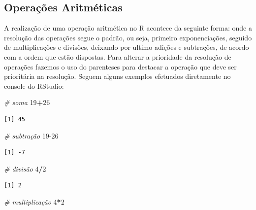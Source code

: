 \documentclass[12pt,brazil,oneside]{book}
\newenvironment{Shaded}{\begin{snugshade}}{\end{snugshade}}
\newcommand{\CommentTok}[1]{\textcolor[rgb]{0.56,0.35,0.01}{\textit{#1}}}
\newcommand{\DecValTok}[1]{\textcolor[rgb]{0.00,0.00,0.81}{#1}}
\newcommand{\OperatorTok}[1]{\textcolor[rgb]{0.81,0.36,0.00}{\textbf{#1}}}
\begin{document}
\hypertarget{operacoes-aritmeticas}{%
\subsection{Operações Aritméticas}\label{operacoes-aritmeticas}}

A realização de uma operação aritmética no R acontece da seguinte forma:
onde a resolução das operações segue o padrão, ou seja, primeiro
exponenciações, seguido de multiplicações e divisões, deixando por
ultimo adições e subtrações, de acordo com a ordem que estão dispostas.
Para alterar a prioridade da resolução de operações fazemos o uso do
parenteses para destacar a operação que deve ser prioritária na
resolução. Seguem alguns exemplos efetuados diretamente no console do
RStudio:

\begin{Shaded}
\begin{Highlighting}[]
\CommentTok{# soma}
\DecValTok{19}\OperatorTok{+}\DecValTok{26}
\end{Highlighting}
\end{Shaded}

\begin{verbatim}
[1] 45
\end{verbatim}

\begin{Shaded}
\begin{Highlighting}[]
\CommentTok{# subtração}
\DecValTok{19-26}
\end{Highlighting}
\end{Shaded}

\begin{verbatim}
[1] -7
\end{verbatim}

\begin{Shaded}
\begin{Highlighting}[]
\CommentTok{# divisão}
\DecValTok{4}\OperatorTok{/}\DecValTok{2}
\end{Highlighting}
\end{Shaded}

\begin{verbatim}
[1] 2
\end{verbatim}

\begin{Shaded}
\begin{Highlighting}[]
\CommentTok{# multiplicação }
\DecValTok{4}\OperatorTok{*}\DecValTok{2}
\end{Highlighting}
\end{Shaded}
\end{document}
